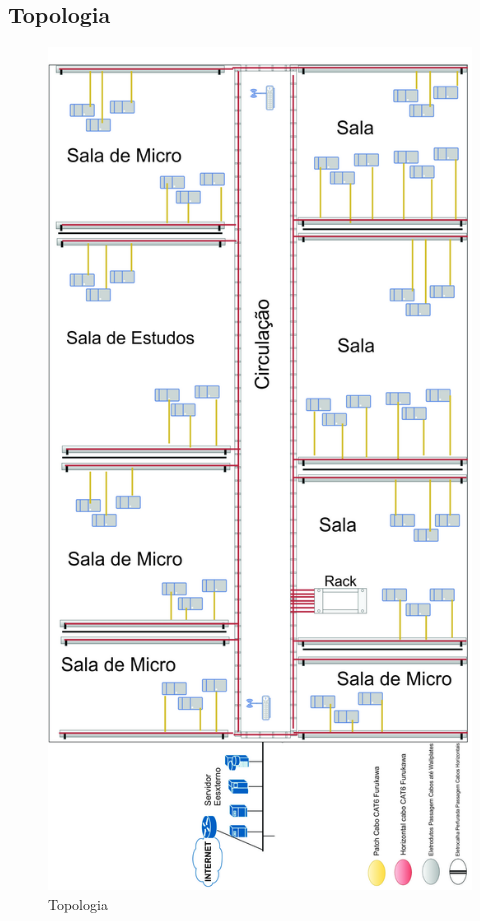 \documentclass[	DIV=calc,%
paper=a4,%
fontsize=12pt,%
onecolumn]{scrartcl}	 					%
\begin{document}
	\subsection{Topologia}
	\begin{figure}[!h]
		\centering
		\caption{Topologia}
		\includegraphics{topologia}
	\end{figure}
	
\end{document}
